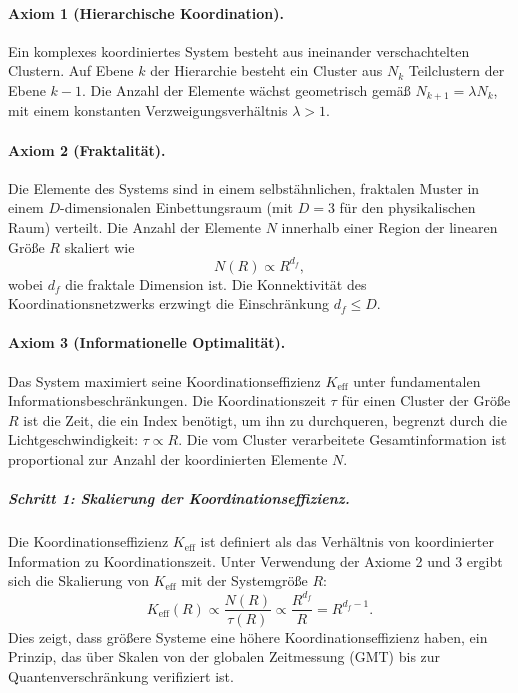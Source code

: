 \documentclass[12pt,a4paper]{article}
\theoremstyle{remark}
\newcommand{\Ke}{K_{\mathrm{eff}}}
\begin{document}
	\paragraph{Axiom 1 (Hierarchische Koordination).}
	Ein komplexes koordiniertes System besteht aus ineinander verschachtelten Clustern. Auf Ebene \(k\) der Hierarchie besteht ein Cluster aus \(N_k\) Teilclustern der Ebene \(k-1\). Die Anzahl der Elemente wächst geometrisch gemäß \(N_{k+1} = \lambda N_k\), mit einem konstanten Verzweigungsverhältnis \(\lambda > 1\).
	
	\paragraph{Axiom 2 (Fraktalität).}
	Die Elemente des Systems sind in einem selbstähnlichen, fraktalen Muster in einem \(D\)-dimensionalen Einbettungsraum (mit \(D = 3\) für den physikalischen Raum) verteilt. Die Anzahl der Elemente \(N\) innerhalb einer Region der linearen Größe \(R\) skaliert wie
	\begin{equation}
		N(R) \propto R^{d_f},
		\label{eq:fractal_dim}
	\end{equation}
	wobei \(d_f\) die fraktale Dimension ist. Die Konnektivität des Koordinationsnetzwerks erzwingt die Einschränkung \(d_f \le D\).
	
	\paragraph{Axiom 3 (Informationelle Optimalität).}
	Das System maximiert seine Koordinationseffizienz \(\Ke\) unter fundamentalen Informationsbeschränkungen. Die Koordinationszeit \(\tau\) für einen Cluster der Größe \(R\) ist die Zeit, die ein Index benötigt, um ihn zu durchqueren, begrenzt durch die Lichtgeschwindigkeit: \(\tau \propto R\). Die vom Cluster verarbeitete Gesamtinformation ist proportional zur Anzahl der koordinierten Elemente \(N\).
	
	\subparagraph*{Schritt 1: Skalierung der Koordinationseffizienz.}
	Die Koordinationseffizienz \(\Ke\) ist definiert als das Verhältnis von koordinierter Information zu Koordinationszeit. Unter Verwendung der Axiome 2 und 3 ergibt sich die Skalierung von \(\Ke\) mit der Systemgröße \(R\):
	\begin{equation}
		\Ke(R) \propto \frac{N(R)}{\tau(R)} \propto \frac{R^{d_f}}{R} = R^{d_f - 1}.
		\label{eq:keff_scale}
	\end{equation}
	Dies zeigt, dass größere Systeme eine höhere Koordinationseffizienz haben, ein Prinzip, das über Skalen von der globalen Zeitmessung (GMT) bis zur Quantenverschränkung verifiziert ist.
	
\end{document}
